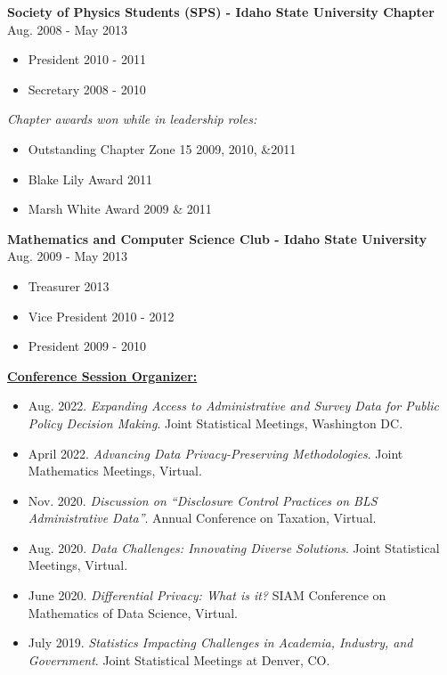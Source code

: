 \documentclass[11pt, letterpaper, roman]{moderncv} %
\newcommand{\leadershipspace}{\vspace{4pt}}
\begin{document}
\leadershipspace
\textbf{Society of Physics Students (SPS) - Idaho State University Chapter} \hfill Aug. 2008 - May 2013

\begin{itemize}
    \item President \hfill 2010 - 2011
    \item Secretary \hfill 2008 - 2010
\end{itemize}
\textit{Chapter awards won while in leadership roles:}
\begin{itemize}
    \item Outstanding Chapter Zone 15 \hfill 2009, 2010, \&2011
    \item Blake Lily Award \hfill 2011
    \item Marsh White Award \hfill 2009 \& 2011
\end{itemize}

\leadershipspace
\textbf{Mathematics and Computer Science Club - Idaho State University} \hfill Aug. 2009 - May 2013
\begin{itemize}
    \item Treasurer \hfill 2013
    \item Vice President \hfill 2010 - 2012
    \item President \hfill 2009 - 2010
\end{itemize}

\vspace{12pt}
\underline{\textbf{\large Conference Session Organizer:}}\normalsize

\begin{itemize}\setlength\itemsep{2pt}
    \item Aug. 2022. \textit{Expanding Access to Administrative and Survey Data for Public Policy Decision Making}. Joint Statistical Meetings, Washington DC. 
    \item April 2022. \textit{Advancing Data Privacy-Preserving Methodologies}. Joint Mathematics Meetings, Virtual.  
     \item Nov. 2020. \textit{Discussion on ``Disclosure Control Practices on BLS Administrative Data''}. Annual Conference on Taxation, Virtual.   
    \item Aug. 2020. \textit{Data Challenges: Innovating Diverse Solutions}. Joint Statistical Meetings, Virtual.
    \item June 2020. \textit{Differential Privacy: What is it?} SIAM Conference on Mathematics of Data Science, Virtual.
    \item July 2019. \textit{Statistics Impacting Challenges in Academia, Industry, and Government}. Joint Statistical Meetings at Denver, CO.
\end{itemize}
\end{document}
